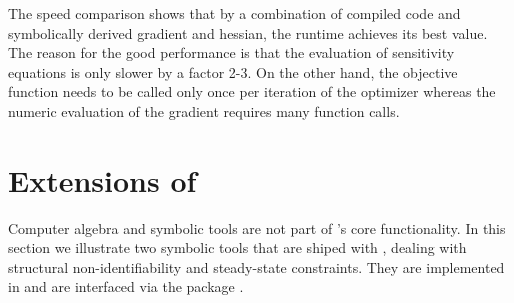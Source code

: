 \documentclass[article]{jss}
\begin{document}
The speed comparison shows that by a combination of compiled code and symbolically derived gradient and hessian, the runtime achieves its best value. The reason for the good performance is that the evaluation of sensitivity equations is only slower by a factor 2-3. On the other hand, the objective function needs to be called only once per iteration of the optimizer whereas the numeric evaluation of the gradient requires many function calls. 

\section[Extensions of dMod]{Extensions of }
\label{sec:extensions}
Computer algebra and symbolic tools are not part of 's core functionality. In this section we illustrate two symbolic tools that are shiped with ,  dealing with structural non-identifiability and steady-state constraints. They are implemented in  and are interfaced via the  package \citep{rPython}.
\end{document}
